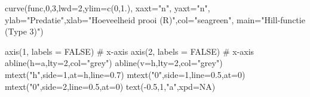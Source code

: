 \documentclass[
  a4paper,
]{scrbook}
\newenvironment{Shaded}{\begin{snugshade}}{\end{snugshade}}
\newcommand{\AttributeTok}[1]{\textcolor[rgb]{0.40,0.45,0.13}{#1}}
\newcommand{\CommentTok}[1]{\textcolor[rgb]{0.37,0.37,0.37}{#1}}
\newcommand{\ConstantTok}[1]{\textcolor[rgb]{0.56,0.35,0.01}{#1}}
\newcommand{\DecValTok}[1]{\textcolor[rgb]{0.68,0.00,0.00}{#1}}
\newcommand{\FloatTok}[1]{\textcolor[rgb]{0.68,0.00,0.00}{#1}}
\newcommand{\FunctionTok}[1]{\textcolor[rgb]{0.28,0.35,0.67}{#1}}
\newcommand{\NormalTok}[1]{\textcolor[rgb]{0.00,0.23,0.31}{#1}}
\newcommand{\SpecialCharTok}[1]{\textcolor[rgb]{0.37,0.37,0.37}{#1}}
\newcommand{\StringTok}[1]{\textcolor[rgb]{0.13,0.47,0.30}{#1}}
\theoremstyle{definition}
\theoremstyle{remark}
\begin{document}
\begin{Shaded}
\begin{Highlighting}[]
\FunctionTok{curve}\NormalTok{(func,}\DecValTok{0}\NormalTok{,}\DecValTok{3}\NormalTok{,}\AttributeTok{lwd=}\DecValTok{2}\NormalTok{,}\AttributeTok{ylim=}\FunctionTok{c}\NormalTok{(}\DecValTok{0}\NormalTok{,}\FloatTok{1.}\NormalTok{), }\AttributeTok{xaxt=}\StringTok{"n"}\NormalTok{, }\AttributeTok{yaxt=}\StringTok{"n"}\NormalTok{,}
      \AttributeTok{ylab=}\StringTok{"Predatie"}\NormalTok{,}\AttributeTok{xlab=}\StringTok{"Hoeveelheid prooi (R)"}\NormalTok{,}\AttributeTok{col=}\StringTok{"seagreen"}\NormalTok{,}
      \AttributeTok{main=}\StringTok{"Hill{-}functie (Type 3)"}\NormalTok{)}

\FunctionTok{axis}\NormalTok{(}\DecValTok{1}\NormalTok{, }\AttributeTok{labels =} \ConstantTok{FALSE}\NormalTok{) }\CommentTok{\# x{-}axis}
\FunctionTok{axis}\NormalTok{(}\DecValTok{2}\NormalTok{, }\AttributeTok{labels =} \ConstantTok{FALSE}\NormalTok{) }\CommentTok{\# x{-}axis}
\FunctionTok{abline}\NormalTok{(}\AttributeTok{h=}\NormalTok{a,}\AttributeTok{lty=}\DecValTok{2}\NormalTok{,}\AttributeTok{col=}\StringTok{"grey"}\NormalTok{)}
\FunctionTok{abline}\NormalTok{(}\AttributeTok{v=}\NormalTok{h,}\AttributeTok{lty=}\DecValTok{2}\NormalTok{,}\AttributeTok{col=}\StringTok{"grey"}\NormalTok{)}
\FunctionTok{mtext}\NormalTok{(}\StringTok{"h"}\NormalTok{,}\AttributeTok{side=}\DecValTok{1}\NormalTok{,}\AttributeTok{at=}\NormalTok{h,}\AttributeTok{line=}\FloatTok{0.7}\NormalTok{)}
\FunctionTok{mtext}\NormalTok{(}\StringTok{"0"}\NormalTok{,}\AttributeTok{side=}\DecValTok{1}\NormalTok{,}\AttributeTok{line=}\FloatTok{0.5}\NormalTok{,}\AttributeTok{at=}\DecValTok{0}\NormalTok{)}
\FunctionTok{mtext}\NormalTok{(}\StringTok{"0"}\NormalTok{,}\AttributeTok{side=}\DecValTok{2}\NormalTok{,}\AttributeTok{line=}\FloatTok{0.5}\NormalTok{,}\AttributeTok{at=}\DecValTok{0}\NormalTok{)}
\FunctionTok{text}\NormalTok{(}\SpecialCharTok{{-}}\FloatTok{0.5}\NormalTok{,}\DecValTok{1}\NormalTok{,}\StringTok{"a"}\NormalTok{,}\AttributeTok{xpd=}\ConstantTok{NA}\NormalTok{)}
\end{Highlighting}
\end{Shaded}
\end{document}

